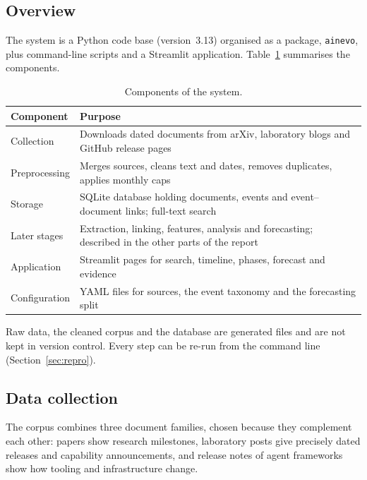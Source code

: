 \documentclass[11pt,a4paper]{article}
\newcommand{\code}[1]{\texttt{#1}}
\begin{document}
\subsection{Overview}
The system is a Python code base (version~3.13) organised as a package, \code{ainevo}, plus command-line
scripts and a Streamlit application. Table~\ref{tab:overview} summarises the components.

\begin{table}[ht]
\centering
\small
\begin{tabular}{@{}p{3.3cm}p{11.7cm}@{}}
\toprule
Component & Purpose \\
\midrule
Collection & Downloads dated documents from arXiv, laboratory blogs and GitHub release pages \\
Preprocessing & Merges sources, cleans text and dates, removes duplicates, applies monthly caps \\
Storage & SQLite database holding documents, events and event--document links; full-text search \\
Later stages & Extraction, linking, features, analysis and forecasting; described in the other parts of the report \\
Application & Streamlit pages for search, timeline, phases, forecast and evidence \\
Configuration & YAML files for sources, the event taxonomy and the forecasting split \\
\bottomrule
\end{tabular}
\caption{Components of the system.}
\label{tab:overview}
\end{table}

Raw data, the cleaned corpus and the database are generated files and are not kept in version control. Every
step can be re-run from the command line (Section~\ref{sec:repro}).

\subsection{Data collection}
\label{sec:collection}
The corpus combines three document families, chosen because they complement each other: papers show research
milestones, laboratory posts give precisely dated releases and capability announcements, and release notes of
agent frameworks show how tooling and infrastructure change.
\end{document}
